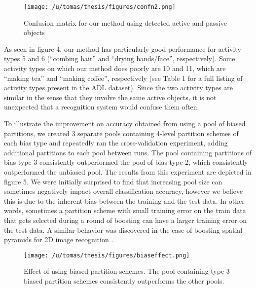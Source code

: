 \documentclass[10pt,twocolumn,letterpaper]{article}
\begin{document}
  \begin{figure}[t]
		\begin{center}
			  \texttt{[image: /u/tomas/thesis/figures/confn2.png]}
		\end{center}
		   \caption{Confusion matrix for our method using detected active and
       passive objects}
				\label{fig:long}
				\label{fig:onecol}
	\end{figure}
	As seen in figure 4, our method has particularly good
  performance for activity types 5 and 6 (``combing hair'' and ``drying
  hands/face'', respectively). Some activity types on which our method does
  poorly are 10 and 11, which are ``making tea'' and ``making coffee'',
  respectively (see Table 1 for a full listing of activity types present in
  the ADL dataset). Since the two activity types are similar in the sense that
  they involve the same active objects, it is not
  unexpected that a recognition system would confuse them often.
  
  To illustrate the improvement on accuracy obtained from using a pool of
  biased partitions, we created 3 separate pools containing 4-level
  partition schemes of each bias type and
  repeatedly ran the cross-validation experiment, adding additional
  partitions to each pool between runs. The pool containing partitions of
  bias type 3 consistently outperformed the pool of bias type 2, which
  consistently outperformed the unbiased pool. The
  results from this experiment are depicted in figure 5. We were initially
  surprised to find that increasing pool size can
  sometimes negatively impact overall classification accuracy, however we
  believe this is due to the inherent bias between the training and the test
  data. In other words, sometimes a partition scheme with small training error
  on the train data that gets selected during a round of boosting can have a
  larger training error on the test data. A similar behavior was discovered
  in the case of boosting spatial pyramids for 2D image recognition
  \cite{Jiang12}.
 
  \begin{figure}[t]
		\begin{center}
			  \texttt{[image: /u/tomas/thesis/figures/biaseffect.png]}
		\end{center}
		   \caption{Effect of using biased partition schemes. The pool
       containing type 3 biased partition schemes consistently outperforms
     the other pools.}
				\label{fig:long}
				\label{fig:onecol}
	\end{figure}
  
\end{document}
